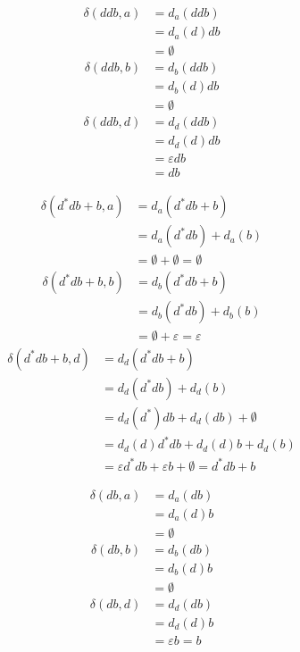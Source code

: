\begin{align*}
	\delta(ddb, a) &= d_a(ddb) \\
	&= d_a(d)db \\
	&= \emptyset
\end{align*}
\begin{align*}
	\delta(ddb, b) &= d_b(ddb) \\
	&= d_b(d)db \\
	&= \emptyset
\end{align*}
\begin{align*}
	\delta(ddb, d) &= d_d(ddb) \\
	&= d_d(d)db\\
	&= \varepsilon db \\
	&= db
\end{align*}

\begin{align*}
	\delta(d^*db + b, a) &= d_a(d^*db + b) \\
	&= d_a(d^*db) + d_a(b) \\
	&= \emptyset + \emptyset = \emptyset
\end{align*}
\begin{align*}
	\delta(d^*db + b, b) &= d_b(d^*db + b) \\
	&= d_b(d^*db) + d_b(b) \\
	&= \emptyset + \varepsilon = \varepsilon
\end{align*}
\begin{align*}
	\delta(d^*db + b, d) &= d_d(d^*db + b) \\
	&= d_d(d^*db) + d_d(b) \\
	&= d_d(d^*)db + d_d(db) + \emptyset \\
	&= d_d(d)d^*db + d_d(d)b + d_d(b) \\
	&= \varepsilon d^*db + \varepsilon b + \emptyset = d^*db + b
\end{align*}

\begin{align*}
	\delta(db, a) &= d_a(db) \\
	&= d_a(d)b \\
	&= \emptyset
\end{align*}
\begin{align*}
	\delta(db, b) &= d_b(db) \\
	&= d_b(d)b \\
	&= \emptyset
\end{align*}
\begin{align*}
	\delta(db, d) &= d_d(db) \\
	&= d_d(d)b \\
	&= \varepsilon b = b
\end{align*}

